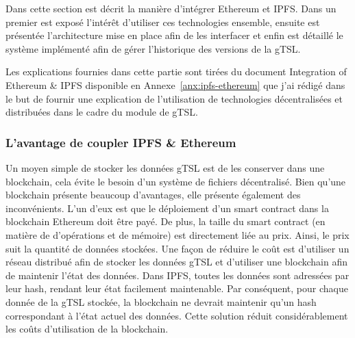 \documentclass{tnreport}
\begin{document}

Dans cette section est décrit la manière d'intégrer Ethereum et IPFS. Dans un premier est exposé l'intérêt d'utiliser ces technologies ensemble, ensuite est présentée l'architecture mise en place afin de les interfacer et enfin est détaillé le système implémenté afin de gérer l'historique des versions de la gTSL.

Les explications fournies dans cette partie sont tirées du document Integration of Ethereum \& IPFS disponible en Annexe~\ref{anx:ipfs-ethereum} que j'ai rédigé dans le but de fournir une explication de l'utilisation de technologies décentralisées et distribuées dans le cadre du module de gTSL.

\subsubsection{L'avantage de coupler IPFS \& Ethereum}

Un moyen simple de stocker les données gTSL est de les conserver dans une blockchain, cela évite le besoin d'un système de fichiers décentralisé. 
Bien qu'une blockchain présente beaucoup d'avantages, elle présente également des inconvénients.
L'un d'eux est que le déploiement d'un smart contract dans la blockchain Ethereum doit être payé.
De plus, la taille du smart contract (en matière de d'opérations et de mémoire) est directement liée au prix.
Ainsi, le prix suit la quantité de données stockées.
Une façon de réduire le coût est d'utiliser un réseau distribué afin de stocker les données gTSL et d'utiliser une blockchain afin de maintenir l'état des données.
Dans IPFS, toutes les données sont adressées par leur hash, rendant leur état facilement maintenable. Par conséquent, pour chaque donnée de la gTSL stockée, la blockchain ne devrait maintenir qu'un hash correspondant à l'état actuel des données. Cette solution réduit considérablement les coûts d'utilisation de la blockchain.
\end{document}
